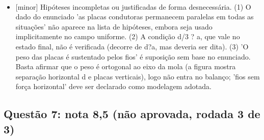 \documentclass{article}%
\begin{document}
$$\begin{itemize}
\item%
{[}minor{]} Hipóteses incompletas ou justificadas de forma desnecessária. (1) O dado do enunciado 'as placas condutoras permanecem paralelas em todas as situações' não aparece na lista de hipóteses, embora seja usado implicitamente no campo uniforme. (2) A condição d/3 ? a, que vale no estado final, não é verificada (decorre de d?a, mas deveria ser dita). (3) 'O peso das placas é sustentado pelos fios' é suposição sem base no enunciado. Basta afirmar que o peso é ortogonal ao eixo da mola (a figura mostra separação horizontal d e placas verticais), logo não entra no balanço; 'fios sem força horizontal' deve ser declarado como modelagem adotada.%
\end{itemize}%
\subsection*{Questão 7: nota 8,5 (não aprovada, rodada 3 de 3)}%
\end{document}
